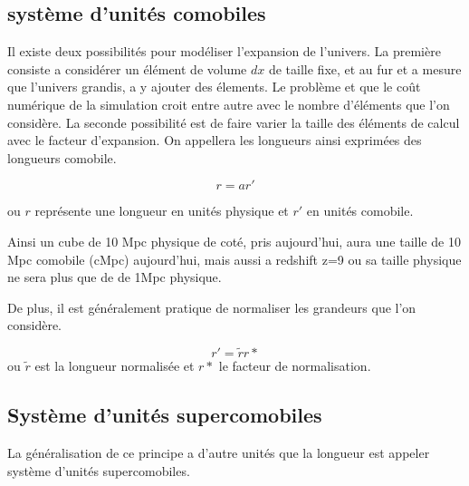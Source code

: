 \subsection{système d'unités comobiles}
Il existe deux possibilités pour modéliser l'expansion de l'univers.
La première consiste a considérer un élément de volume $dx$ de taille fixe, et au fur et a mesure que l'univers grandis, a y ajouter des élements.
Le problème et que le coût numérique de la simulation croit entre autre avec le nombre d'éléments que l'on considère.
La seconde possibilité est de faire varier la taille des éléments de calcul avec le facteur d'expansion.
On appellera les longueurs ainsi exprimées des longueurs comobile.

\begin{equation}
r=a r'
\end{equation}

ou $r$ représente une longueur en unités physique et $r'$ en unités comobile.

Ainsi un cube de 10 Mpc physique de coté, pris aujourd'hui, aura une taille de 10 Mpc comobile (cMpc) aujourd'hui, mais aussi a redshift z=9 ou sa taille physique ne sera plus que de de 1Mpc physique.

De plus, il est généralement pratique de normaliser les grandeurs que l'on considère. 

\begin{equation}
r'=\tilde{r}r*
\end{equation}
ou $\tilde{r}$ est la longueur normalisée et $r*$ le facteur de normalisation.


\subsection{Système d'unités supercomobiles}
La généralisation de ce principe a d'autre unités que la longueur est appeler système d'unités supercomobiles.
\citep{martel_convenient_1998}


